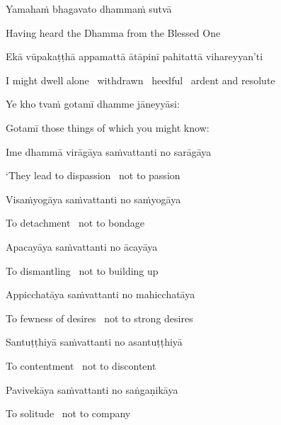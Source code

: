 Yamahaṁ bhagavato dhammaṁ sutvā

\begin{cprenglish}
  Having heard the Dhamma from the Blessed One
\end{cprenglish}

Ekā vūpakaṭṭhā appamattā ātāpinī pahitattā vihareyyan’ti

\begin{cprenglish}
  I might dwell alone \breathmark\ withdrawn \breathmark\ heedful \breathmark\ ardent and resolute
\end{cprenglish}

Ye kho tvaṁ gotamī dhamme jāneyyāsi:

\begin{cprenglish}
  Gotamī those things of which you might know:
\end{cprenglish}

Ime dhammā virāgāya saṁvattanti no sarāgāya

\begin{cprenglish}
  ‘They lead to dispassion \breathmark\ not to passion
\end{cprenglish}

Visaṁyogāya saṁvattanti no saṁyogāya

\begin{cprenglish}
  To detachment \breathmark\ not to bondage
\end{cprenglish}

Apacayāya saṁvattanti no ācayāya

\begin{cprenglish}
  To dismantling \breathmark\ not to building up
\end{cprenglish}

Appicchatāya saṁvattanti no mahicchatāya

\begin{cprenglish}
  To fewness of desires \breathmark\ not to strong desires
\end{cprenglish}

Santuṭṭhiyā saṁvattanti no asantuṭṭhiyā

\begin{cprenglish}
  To contentment \breathmark\ not to discontent
\end{cprenglish}

Pavivekāya saṁvattanti no saṅgaṇikāya

\begin{cprenglish}
  To solitude \breathmark\ not to company
\end{cprenglish}

